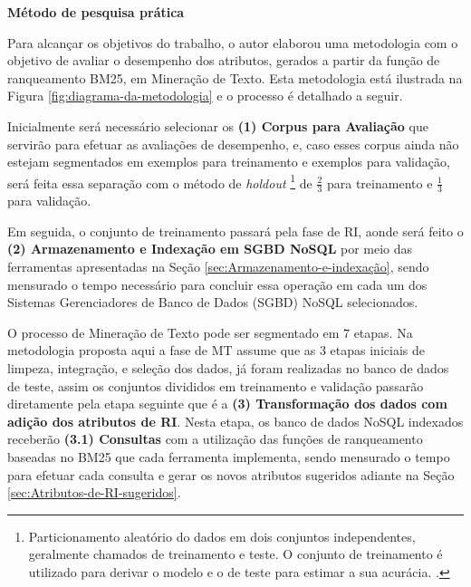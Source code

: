 \textbf{Método de pesquisa prática}


Para alcançar os objetivos do trabalho, o autor elaborou uma metodologia com o objetivo de avaliar o desempenho dos atributos, gerados a partir da função de ranqueamento BM25, em Mineração de Texto. 
Esta metodologia está ilustrada na Figura \ref{fig:diagrama-da-metodologia} e o processo é detalhado a seguir.
    
    
    
    Inicialmente será necessário selecionar os \textbf{(1) Corpus para Avaliação} que servirão para efetuar as avaliações de desempenho, e, caso esses corpus ainda não estejam segmentados em exemplos para treinamento e exemplos para validação, será feita essa separação com o método de \textit{holdout}
    \footnote{Particionamento aleatório do dados em dois conjuntos independentes, geralmente chamados de treinamento e teste. O conjunto de treinamento é utilizado para derivar o modelo e o de teste para estimar a sua acurácia. \cite[p.~370]{Han:2011:DMC:1972541}.} 
    de $\frac{2}{3}$ para treinamento e $\frac{1}{3}$ para validação.
    
    Em seguida, o conjunto de treinamento passará pela fase de RI, aonde será feito o \textbf{(2) Armazenamento e Indexação em  SGBD NoSQL} por meio das ferramentas apresentadas na Seção \ref{sec:Armazenamento-e-indexação}, sendo mensurado o tempo necessário para concluir essa operação em cada um dos Sistemas Gerenciadores de Banco de Dados (SGBD) NoSQL selecionados.
    
    O processo de Mineração de Texto pode ser segmentado em 7 etapas.
    Na metodologia proposta aqui a fase de MT assume que as 3 etapas iniciais de limpeza, integração, e seleção dos dados, já foram realizadas no banco de dados de teste, assim os conjuntos divididos em treinamento e validação passarão diretamente pela etapa seguinte que é a \textbf{(3) Transformação dos dados com adição dos atributos de RI}.
    Nesta etapa, os banco de dados NoSQL indexados receberão \textbf{(3.1) Consultas} com a utilização das funções de ranqueamento baseadas no BM25 que cada ferramenta implementa, sendo mensurado o tempo para efetuar cada consulta e gerar os novos atributos sugeridos adiante na Seção \ref{sec:Atributos-de-RI-sugeridos}.
    
